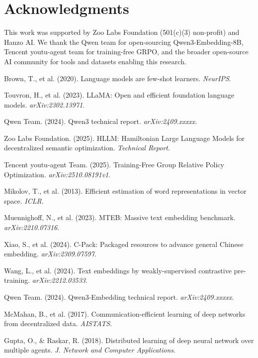 \documentclass[11pt,a4paper]{article}
\begin{document}
\section*{Acknowledgments}

This work was supported by Zoo Labs Foundation (501(c)(3) non-profit) and Hanzo AI. We thank the Qwen team for open-sourcing Qwen3-Embedding-8B, Tencent youtu-agent team for training-free GRPO, and the broader open-source AI community for tools and datasets enabling this research.

\begin{thebibliography}{99}

Brown, T., et al. (2020). Language models are few-shot learners. \textit{NeurIPS}.

Touvron, H., et al. (2023). LLaMA: Open and efficient foundation language models. \textit{arXiv:2302.13971}.

Qwen Team. (2024). Qwen3 technical report. \textit{arXiv:2409.xxxxx}.

Zoo Labs Foundation. (2025). HLLM: Hamiltonian Large Language Models for decentralized semantic optimization. \textit{Technical Report}.

Tencent youtu-agent Team. (2025). Training-Free Group Relative Policy Optimization. \textit{arXiv:2510.08191v1}.

Mikolov, T., et al. (2013). Efficient estimation of word representations in vector space. \textit{ICLR}.

Muennighoff, N., et al. (2023). MTEB: Massive text embedding benchmark. \textit{arXiv:2210.07316}.

Xiao, S., et al. (2024). C-Pack: Packaged resources to advance general Chinese embedding. \textit{arXiv:2309.07597}.

Wang, L., et al. (2024). Text embeddings by weakly-supervised contrastive pre-training. \textit{arXiv:2212.03533}.

Qwen Team. (2024). Qwen3-Embedding technical report. \textit{arXiv:2409.xxxxx}.

McMahan, B., et al. (2017). Communication-efficient learning of deep networks from decentralized data. \textit{AISTATS}.

Gupta, O., \& Raskar, R. (2018). Distributed learning of deep neural network over multiple agents. \textit{J. Network and Computer Applications}.


\end{thebibliography}
\end{document}
